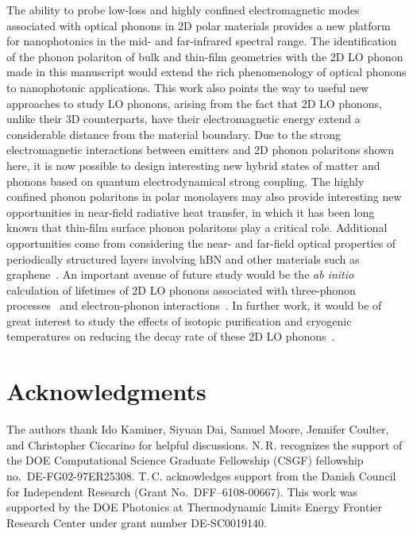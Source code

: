 \documentclass[aps,prb,twocolumn,
	           groupedaddress,superscriptaddress,
               amsfonts,amssymb,amsmath,floatfix,
	           citeautoscript]{revtex4-1}
\begin{document}
The ability to probe low-loss and highly confined electromagnetic modes associated with optical phonons in 2D polar materials provides a new platform for nanophotonics in the mid- and far-infrared spectral range. The identification of the phonon polariton of bulk and thin-film geometries with the 2D LO phonon made in this manuscript would extend the rich phenomenology of optical phonons to nanophotonic applications. This work also points the way to useful new approaches to study LO phonons, arising from the fact that 2D LO phonons, unlike their 3D counterparts, have their electromagnetic energy extend a considerable distance from the material boundary. Due to the strong electromagnetic interactions between emitters and 2D phonon polaritons shown here, it is now possible to design interesting new hybrid states of matter and phonons based on quantum electrodynamical strong coupling. The highly confined phonon polaritons in polar monolayers may also provide interesting new opportunities in near-field radiative heat transfer, in which it has been long known that thin-film surface phonon polaritons play a critical role. Additional opportunities come from considering the near- and far-field optical properties of periodically structured layers involving hBN and other materials such as graphene~\cite{papadakis2017ultralight}. An important avenue of future study would be the \emph{ab initio} calculation of lifetimes of 2D LO phonons associated with three-phonon processes~\cite{caldwell2015low ,srivastava1990physics} and electron-phonon interactions~\cite{sundararaman2014theoretical, sohier2016two, ciccarino2018dynamics}. In further work, it would be of great interest to study the effects of isotopic purification and cryogenic temperatures on reducing the decay rate of these 2D LO phonons~\cite{giles2017ultra}.


\section{Acknowledgments}
The authors thank Ido Kaminer, Siyuan Dai, Samuel Moore, Jennifer Coulter, and Christopher Ciccarino for helpful discussions.
N.\,{}R. recognizes the support of the DOE Computational Science Graduate Fellowship (CSGF) fellowship no.\ DE-FG02-97ER25308. 
T.\,{}C. acknowledges support from the Danish Council for Independent Research (Grant No.\ DFF--6108-00667). 
This work was supported by the DOE Photonics at Thermodynamic Limits Energy Frontier Research Center under grant number DE-SC0019140.





\end{document}

